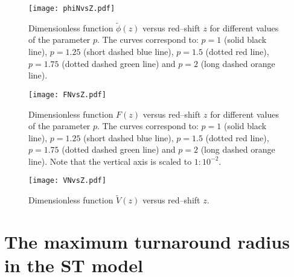 \begin{figure}[ht!]
\centering
\texttt{[image: phiNvsZ.pdf]}
\caption{\label{fig:1} 
Dimensionless function $\tilde{\phi}(z)$ versus red--shift $z$ for different values of the parameter $p$. The curves correspond to: $p=1$ (solid black line), $p=1.25$ (short dashed blue line), $p=1.5$ (dotted red line), $p=1.75$ (dotted dashed green line) and $p=2$ (long dashed orange line).
}
\end{figure}



\begin{figure}[ht!]
\centering
\texttt{[image: FNvsZ.pdf]}
\caption{\label{fig:2} 
Dimensionless function $F(z)$ versus red--shift $z$ for different values of the parameter $p$. The curves correspond to: $p=1$ (solid black line), $p=1.25$ (short dashed blue line), $p=1.5$ (dotted red line), $p=1.75$ (dotted dashed green line) and $p=2$ (long dashed orange line). Note that the vertical axis is scaled to $1 : 10^{-2}$.
}
\end{figure}



\begin{figure}[ht!]
\centering
\texttt{[image: VNvsZ.pdf]}
\caption{\label{fig:3} 
Dimensionless function $\tilde{V}(z)$ versus red--shift $z$.
}
\end{figure}



\section{The maximum turnaround radius in the ST model}

